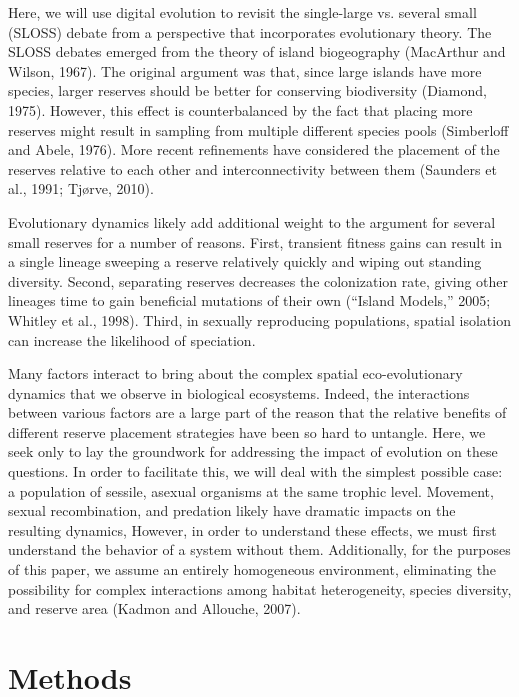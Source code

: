 \documentclass[letterpaper]{article}
\begin{document}
    Here, we will use digital evolution to revisit the single-large vs. several small (SLOSS) debate from a perspective that incorporates evolutionary theory. The SLOSS debates emerged from the theory of island biogeography (MacArthur and Wilson, 1967). The original argument was that, since large islands have more species, larger reserves should be better for conserving biodiversity (Diamond, 1975). However, this effect is counterbalanced by the fact that placing more reserves might result in sampling from multiple different species pools (Simberloff and Abele, 1976). More recent refinements have considered the placement of the reserves relative to each other and interconnectivity between them (Saunders et al., 1991; Tjørve, 2010). 
    
	Evolutionary dynamics likely add additional weight to the argument for several small reserves for a number of reasons. First, transient fitness gains can result in a single lineage sweeping a reserve relatively quickly and wiping out standing diversity. Second, separating reserves decreases the colonization rate, giving other lineages time to gain beneficial mutations of their own (“Island Models,” 2005; Whitley et al., 1998). Third, in sexually reproducing populations, spatial isolation can increase the likelihood of speciation.
    
	Many factors interact to bring about the complex spatial eco-evolutionary dynamics that we observe in biological ecosystems. Indeed, the interactions between various factors are a large part of the reason that the relative benefits of different reserve placement strategies have been so hard to untangle. Here, we seek only to lay the groundwork for addressing the impact of evolution on these questions. In order to facilitate this, we will deal with the simplest possible case: a population of sessile, asexual organisms at the same trophic level. Movement, sexual recombination, and predation likely have dramatic impacts on the resulting dynamics, However, in order to understand these effects, we must first understand the behavior of a system without them. Additionally, for the purposes of this paper, we assume an entirely homogeneous environment, eliminating the possibility for complex interactions among habitat heterogeneity, species diversity, and reserve area (Kadmon and Allouche, 2007).

\section{Methods}
\end{document}

